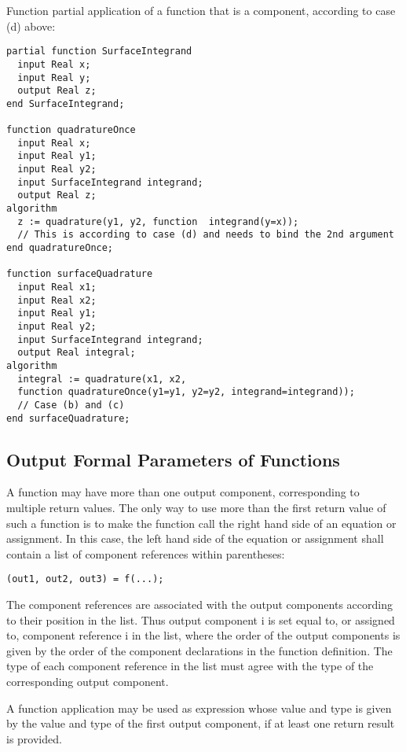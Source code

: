 \begin{example}
Function partial application of a function that is a component, according to case (d) above:
\begin{lstlisting}[language=modelica]
partial function SurfaceIntegrand
  input Real x;
  input Real y;
  output Real z;
end SurfaceIntegrand;

function quadratureOnce
  input Real x;
  input Real y1;
  input Real y2;
  input SurfaceIntegrand integrand;
  output Real z;
algorithm
  z := quadrature(y1, y2, function  integrand(y=x));
  // This is according to case (d) and needs to bind the 2nd argument
end quadratureOnce;

function surfaceQuadrature
  input Real x1;
  input Real x2;
  input Real y1;
  input Real y2;
  input SurfaceIntegrand integrand;
  output Real integral;
algorithm
  integral := quadrature(x1, x2,
  function quadratureOnce(y1=y1, y2=y2, integrand=integrand));
  // Case (b) and (c)
end surfaceQuadrature;
\end{lstlisting}
\end{example}

\subsection{Output Formal Parameters of Functions}

A function may have more than one output component, corresponding to
multiple return values. The only way to use more than the first return
value of such a function is to make the function call the right hand
side of an equation or assignment. In this case, the left hand side of
the equation or assignment shall contain a list of component references
within parentheses:

\lstinline!(out1, out2, out3) = f(...);!

The component references are associated with the output components
according to their position in the list. Thus output component i is set
equal to, or assigned to, component reference i in the list, where the
order of the output components is given by the order of the component
declarations in the function definition. The type of each component
reference in the list must agree with the type of the corresponding
output component.

A function application may be used as expression whose value and type is
given by the value and type of the first output component, if at least
one return result is provided.

